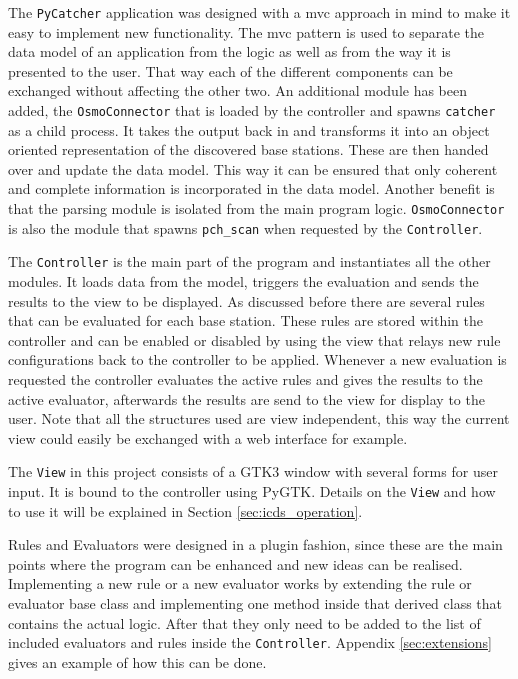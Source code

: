 The \texttt{PyCatcher} application was designed with a \gls{mvc} approach in mind to make it easy to implement new functionality.
The \gls{mvc} pattern is used to separate the data model of an application from the logic as well as from the way it is presented to the user.
That way each of the different components can be exchanged without affecting the other two.
An additional module has been added, the \texttt{OsmoConnector} that is loaded by the controller and spawns \texttt{catcher} as a child process.
It takes the output back in and transforms it into an object oriented representation of the discovered base stations.
These are then handed over and update the data model.
This way it can be ensured that only coherent and complete information is incorporated in the data model.
Another benefit is that the parsing module is isolated from the main program logic.
\texttt{OsmoConnector} is also the module that spawns \texttt{pch\_scan} when requested by the \texttt{Controller}.

The \texttt{Controller} is the main part of the program and instantiates all the other modules.
It loads data from the model, triggers the evaluation and sends the results to the view to be displayed.
As discussed before there are several rules that can be evaluated for each base station.
These rules are stored within the controller and can be enabled or disabled by using the view that relays new rule configurations back to the controller to be applied. 
Whenever a new evaluation is requested the controller evaluates the active rules and gives the results to the active evaluator, afterwards the results are send to the view for display to the user.
Note that all the structures used are view independent, this way the current view could easily be exchanged with a web interface for example.

The \texttt{View} in this project consists of a GTK3 window with several forms for user input.
It is bound to the controller using PyGTK.
Details on the \texttt{View} and how to use it will be explained in Section \ref{sec:icds_operation}.

Rules and Evaluators were designed in a plugin fashion, since these are the main points where the program can be enhanced and new ideas can be realised.
Implementing a new rule or a new evaluator works by extending the rule or evaluator base class and implementing one method inside that derived class that contains the actual logic.
After that they only need to be added to the list of included evaluators and rules inside the \texttt{Controller}.
Appendix \ref{sec:extensions} gives an example of how this can be done.

